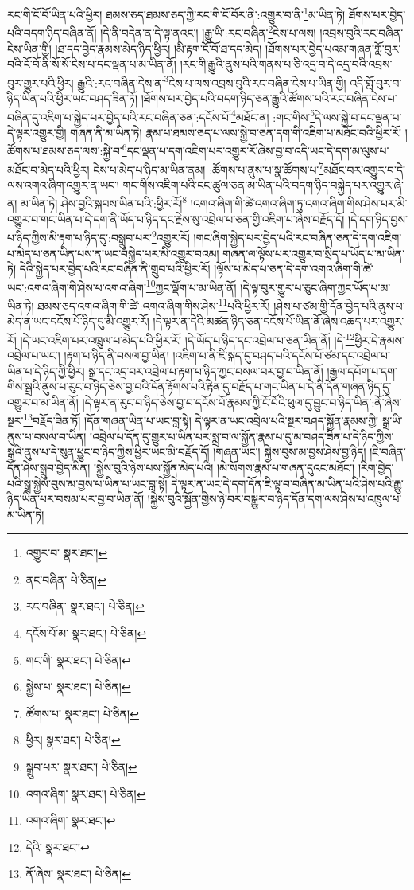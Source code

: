 རང་གི་ངོ་བོ་ཡིན་པའི་ཕྱིར། ཐམས་ཅད་ཐམས་ཅད་ཀྱི་རང་གི་ངོ་བོར་ནི་:འགྱུར་བ་ནི་\footnote{འགྱུར་བ་  སྣར་ཐང་། }མ་ཡིན་ཏེ། ཐོགས་པར་བྱེད་པའི་བདག་ཉིད་བཞིན་ནོ། །དེ་ནི་བདེན་ན་དེ་ལྟ་ནའང་། །རྒྱུ་ཡི་:རང་བཞིན་\footnote{ནང་བཞིན་  པེ་ཅིན། }ངེས་པ་ལས། །འབྲས་བུའི་རང་བཞིན་ངེས་ཡིན་གྱི། །ཐ་དད་བྱེད་རྣམས་མེད་ཉིད་ཕྱིར། །མི་རྟག་ངོ་བོ་ཐ་དད་མེད། །ཐོགས་པར་བྱེད་པའམ་གཞན་གློ་བུར་བའི་ངོ་བོ་ནི་སོ་སོ་ངེས་པ་དང་ལྡན་པ་མ་ཡིན་ནོ། །རང་གི་རྒྱུའི་ནུས་པའི་གནས་པ་ཅི་འདྲ་བ་དེ་འདྲ་བའི་འབྲས་བུར་གྱུར་པའི་ཕྱིར། རྒྱུའི་:རང་བཞིན་དེས་ན་\footnote{རང་བཞིན་  སྣར་ཐང་།  པེ་ཅིན། }ངེས་པ་ལས་འབྲས་བུའི་རང་བཞིན་ངེས་པ་ཡིན་གྱི། འདི་གློ་བུར་བ་ཉིད་ཡིན་པའི་ཕྱིར་ཡང་བཤད་ཟིན་ཏོ། །ཐོགས་པར་བྱེད་པའི་བདག་ཉིད་ཅན་རྒྱུའི་ཚོགས་པའི་རང་བཞིན་ངེས་པ་བཞིན་དུ་འཇིག་པ་སྐྱེད་པར་བྱེད་པའི་རང་བཞིན་ཅན་:དངོས་པོ་\footnote{དངོས་པོ་མ་  སྣར་ཐང་།  པེ་ཅིན། }མཐོང་ན། :གང་གིས་\footnote{གང་གི་  སྣར་ཐང་།  པེ་ཅིན། }དེ་ལས་སྐྱེ་བ་དང་ལྡན་པ་དེ་ལྟར་འགྱུར་གྱི། གཞན་ནི་མ་ཡིན་ཏེ། རྣམ་པ་ཐམས་ཅད་པ་ལས་སྐྱེ་བ་ཅན་དག་གི་འཇིག་པ་མཐོང་བའི་ཕྱིར་རོ། །ཚོགས་པ་ཐམས་ཅད་ལས་:སྐྱེ་བ་\footnote{སྐྱེས་པ་  སྣར་ཐང་།  པེ་ཅིན། }དང་ལྡན་པ་དག་འཇིག་པར་འགྱུར་རོ་ཞེས་བྱ་བ་འདི་ཡང་དེ་དག་མ་ལུས་པ་མཐོང་བ་མེད་པའི་ཕྱིར། ངེས་པ་མེད་པ་ཉིད་མ་ཡིན་ནམ། :ཚོགས་པ་ནུས་པ་སྣ་ཚོགས་པ་\footnote{ཚོགས་པ་  སྣར་ཐང་།  པེ་ཅིན། }མཐོང་བར་འགྱུར་བ་དེ་ལས་འགའ་ཞིག་འགྱུར་ན་ཡང་། གང་གིས་འཇིག་པའི་ངང་ཚུལ་ཅན་མ་ཡིན་པའི་བདག་ཉིད་བསྐྱེད་པར་འགྱུར་ཞེ་ན། མ་ཡིན་ཏེ། ཤེས་བྱའི་སྐབས་ཡིན་པའི་:ཕྱིར་རོ།\footnote{ཕྱིར།  སྣར་ཐང་།  པེ་ཅིན། } །འགའ་ཞིག་གི་ཚེ་འགའ་ཞིག་ཏུ་འགའ་ཞིག་གིས་ཤེས་པར་མི་འགྱུར་བ་གང་ཡིན་པ་དེ་དག་ནི་ཡོད་པ་ཉིད་དང་རྗེས་སུ་འབྲེལ་པ་ཅན་གྱི་འཇིག་པ་ཞེས་བརྗོད་དོ། །དེ་དག་ཉིད་བྱས་པ་ཉིད་ཀྱིས་མི་རྟག་པ་ཉིད་དུ་:བསྒྲུབ་པར་\footnote{སྒྲུབ་པར་  སྣར་ཐང་།  པེ་ཅིན། }འགྱུར་རོ། །གང་ཞིག་སྐྱེད་པར་བྱེད་པའི་རང་བཞིན་ཅན་དེ་དག་འཇིག་པ་མེད་པ་ཅན་ཡིན་པས་ན་ཡང་བསྐྱེད་པར་མི་འགྱུར་བའམ། གཞན་ལ་ལྟོས་པར་འགྱུར་བ་སྲིད་པ་ཡོད་པ་མ་ཡིན་ཏེ། དེའི་སྐྱེད་པར་བྱེད་པའི་རང་བཞིན་ནི་གྲུབ་པའི་ཕྱིར་རོ། །ལྟོས་པ་མེད་པ་ཅན་དེ་དག་འགའ་ཞིག་གི་ཚེ་ཡང་:འགའ་ཞིག་གི་ཤེས་པ་འགའ་ཞིག་\footnote{འགའ་ཞིག་  སྣར་ཐང་།  པེ་ཅིན། }ཀྱང་ལྡོག་པ་མ་ཡིན་ནོ། །དེ་ལྟ་བུར་གྱུར་པ་ཅུང་ཞིག་ཀྱང་ཡོད་པ་མ་ཡིན་ཏེ། ཐམས་ཅད་འགའ་ཞིག་གི་ཚེ་:འགའ་ཞིག་གིས་ཤེས་\footnote{འགའ་ཞིག་  སྣར་ཐང་། }པའི་ཕྱིར་རོ། །ཤེས་པ་ཙམ་གྱི་དོན་བྱེད་པའི་ནུས་པ་མེད་ན་ཡང་དངོས་པོ་ཉིད་དུ་མི་འགྱུར་རོ། །དེ་ལྟར་ན་དེའི་མཚན་ཉིད་ཅན་དངོས་པོ་ཡིན་ནོ་ཞེས་འཆད་པར་འགྱུར་རོ། །དེ་ཡང་འཇིག་པར་འཁྲུལ་པ་མེད་པའི་ཕྱིར་རོ། །དེ་ཡོད་པ་ཉིད་དང་འབྲེལ་པ་ཅན་ཡིན་ནོ། །དེ་\footnote{དེའི་  སྣར་ཐང་། }ཕྱིར་དེ་རྣམས་འབྲེལ་པ་ཡང་། །རྟག་པ་ཉིད་ནི་བསལ་བྱ་ཡིན། །འཇིག་པ་ནི་ཇི་སྐད་དུ་བཤད་པའི་དངོས་པོ་ཙམ་དང་འབྲེལ་པ་ཡིན་པ་དེ་ཉིད་ཀྱི་ཕྱིར། སྒྲ་དང་འདྲ་བར་འབྲེལ་པ་རྟག་པ་ཉིད་ཀྱང་བསལ་བར་བྱ་བ་ཡིན་ནོ། །རྒྱལ་དཔོག་པ་དག་གིས་སྒྲའི་ནུས་པ་རུང་བ་ཉིད་ཅེས་བྱ་བའི་དོན་རྟོགས་པའི་རྟེན་དུ་བརྗོད་པ་གང་ཡིན་པ་དེ་ནི་དོན་གཞན་ཉིད་དུ་འགྱུར་བ་མ་ཡིན་ནོ། །དེ་ལྟར་ན་རུང་བ་ཉིད་ཅེས་བྱ་བ་དངོས་པོ་རྣམས་ཀྱི་ངོ་བོའི་ཕུལ་དུ་བྱུང་བ་ཉིད་ཡིན་:ནོ་ཞེས་སྔར་\footnote{ནོ་ཞེས་  སྣར་ཐང་།  པེ་ཅིན། }བརྗོད་ཟིན་ཏོ། །དོན་གཞན་ཡིན་པ་ཡང་བླ་སྟེ། དེ་ལྟར་ན་ཡང་འབྲེལ་པའི་སྔར་བཤད་སྐྱོན་རྣམས་ཀྱི། སྒྲ་ཡི་ནུས་པ་བསལ་བ་ཡིན། །འབྲེལ་པ་དོན་དུ་གྱུར་པ་ཡིན་པར་སྨྲ་བ་ལ་སྐྱོན་རྣམ་པ་དུ་མ་བཤད་ཟིན་པ་དེ་ཉིད་ཀྱིས་སྒྲའི་ནུས་པ་དེ་སུན་ཕྱུང་བ་ཉིད་ཀྱིས་ཕྱིར་ཡང་མི་བརྗོད་དོ། །གཞན་ཡང་། སྐྱེས་བུས་མ་བྱས་ཤེས་བྱ་ཉིད། །ཇི་བཞིན་དོན་ཤེས་སྒྲུབ་བྱེད་མིན། །སྐྱེས་བུའི་ཉེས་པས་སྐྱོན་མེད་པའི། །མེ་སོགས་རྣམ་པ་གཞན་དུའང་མཐོང་། །རིག་བྱེད་པའི་སྒྲ་སྐྱེས་བུས་མ་བྱས་པ་ཡིན་པ་ཡང་བླ་སྟེ། དེ་ལྟར་ན་ཡང་དེ་དག་དོན་ཇི་ལྟ་བ་བཞིན་མ་ཡིན་པའི་ཤེས་པའི་རྒྱུ་ཉིད་ཡིན་པར་བསམ་པར་བྱ་བ་ཡིན་ནོ། །སྐྱེས་བུའི་སྐྱོན་གྱིས་ཉེ་བར་བསྒྱུར་བ་ཉིད་དོན་དག་ལས་ཤེས་པ་འཁྲུལ་པ་མ་ཡིན་ཏེ། 